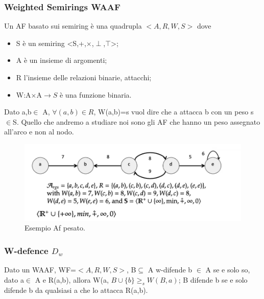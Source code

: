 \subsubsection{Weighted Semirings WAAF}
Un AF basato sui semiring è una quadrupla $<A,R,W,S>$ dove 
\begin{itemize}
    \item S è un semiring <S,+,$\times$,$\perp $,$\top $>;
    \item A è un insieme di argomenti;
    \item R  l'insieme delle relazioni binarie, attacchi;
    \item W:A$\times$A$\xrightarrow{}S$ è una funzione binaria.
\end{itemize}
Dato a,b$\in$ A, $\forall(a,b)\in R$, W(a,b)=s vuol dire che a attacca b con un peso s$\in$S. Quello che andremo a studiare noi sono gli AF che hanno un peso assegnato all'arco e non al nodo.
\begin{figure}[H]
    \centering
    \includegraphics[width=14cm, keepaspectratio]{img/af_wighted.png}
    \caption{Esempio Af pesato.}\label{fig:es_AF_pesato}
\end{figure}

\subsubsection{W-defence $D_w$} 
Dato un WAAF, WF=$<A,R,W,S>$, B$\subseteq$ A w-difende b $\in$ A se e solo so, dato a$\in$ A e R(a,b), allora W(a, $B \cup \{b\} \geq_s W(B,a)$; B difende b se e solo difende b da qualsiasi a che lo attacca R(a,b).


